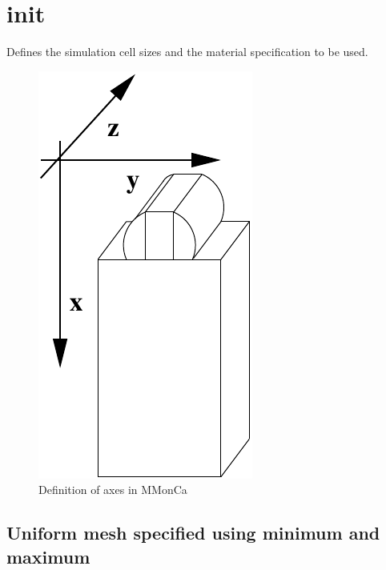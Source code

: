 \section{init} \label{sec-Commands-init}

Defines the simulation cell sizes and the material specification to be used.

\begin{figure}
\begin{center}
\includegraphics{images/axes}
\caption{Definition of axes in MMonCa}
\end{center}
\label{fig:axes}
\end{figure}

\subsection{Uniform mesh specified using minimum and maximum}

